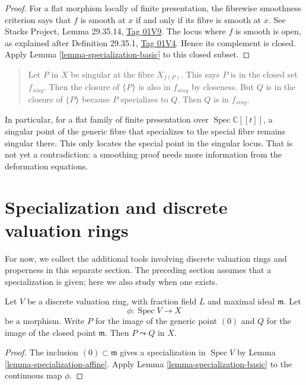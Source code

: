 \begin{proof}
For a flat morphism locally of finite
presentation, the fibrewise smoothness
criterion says that $f$ is smooth at
$x$ if and only if its fibre is smooth
at $x$.
See Stacks Project, Lemma 29.35.14,
\href{https://stacks.math.columbia.edu/tag/%
01V9}{Tag 01V9}.
The locus where $f$ is smooth is open,
as explained after Definition 29.35.1,
\href{https://stacks.math.columbia.edu/tag/%
01V4}{Tag 01V4}.
Hence its complement is closed.
Apply Lemma
\ref{lemma-specialization-basic}
to this closed subset.
\end{proof}

\begin{quote}
Let $P$ in $X$ be singular at the fibre
$X_{f(P)}$. This says $P$ is in the closed
set $f_{sing}$. Then the closure of $\{P\}$
is also in $f_{sing}$ by closeness. But
$Q$ is in the closure of $\{P\}$ because
$P$ specializes to $Q$. Then $Q$ is in
$f_{sing}$.
\end{quote}

\noindent
In particular, for a flat family of finite
presentation over
$\operatorname{Spec}\mathbb{C}[[t]]$,
a singular point of the generic fibre
that specializes to the special fibre
remains singular there.
This only locates the special point in
the singular locus. That is not yet a
contradiction: a smoothing proof needs
more information from the deformation
equations.

\section{Specialization and discrete
valuation rings}
\label{section-specialization-dvr}

\noindent
For now, we collect the additional tools
involving discrete valuation rings and
properness in this separate section.
The preceding section assumes that a
specialization is given; here we also
study when one exists.

\begin{lemma}
\label{lemma-dvr-specialization}
Let $V$ be a discrete valuation ring,
with fraction field $L$ and maximal
ideal $\mathfrak{m}$.
Let
$$
\phi:\operatorname{Spec}V\longrightarrow X
$$
be a morphism.
Write $P$ for the image of the generic
point $(0)$ and $Q$ for the image of
the closed point $\mathfrak{m}$.
Then $P\leadsto Q$ in $X$.
\end{lemma}

\begin{proof}
The inclusion $(0)\subset\mathfrak{m}$
gives a specialization in
$\operatorname{Spec}V$ by Lemma
\ref{lemma-specialization-affine}.
Apply Lemma
\ref{lemma-specialization-basic}
to the continuous map $\phi$.
\end{proof}


